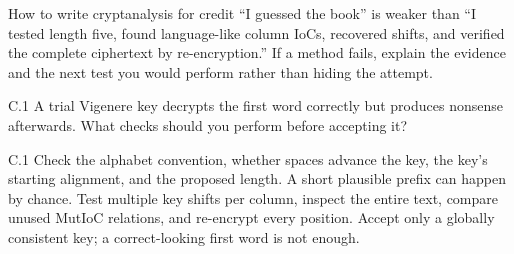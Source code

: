 \documentclass[11pt,a4paper]{article}
\begin{document}
\begin{tip}{How to write cryptanalysis for credit}
``I guessed the book'' is weaker than ``I tested length five, found language-like column IoCs, recovered shifts, and verified the complete ciphertext by re-encryption.'' If a method fails, explain the evidence and the next test you would perform rather than hiding the attempt.
\end{tip}
\begin{question}{C.1}
A trial Vigenere key decrypts the first word correctly but produces nonsense afterwards. What checks should you perform before accepting it?
\end{question}
\begin{answer}{C.1}
Check the alphabet convention, whether spaces advance the key, the key's starting alignment, and the proposed length. A short plausible prefix can happen by chance. Test multiple key shifts per column, inspect the entire text, compare unused MutIoC relations, and re-encrypt every position. Accept only a globally consistent key; a correct-looking first word is not enough.
\end{answer}
\end{document}
